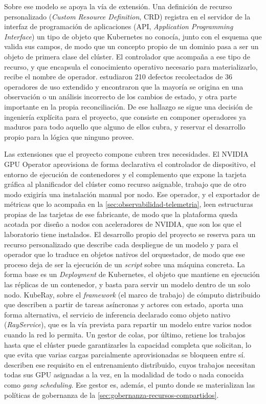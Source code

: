 Sobre ese modelo se apoya la vía de extensión. Una definición de recurso personalizado (\emph{Custom Resource Definition}, CRD) registra en el servidor de la interfaz de programación de aplicaciones (API, \emph{Application Programming Interface}) un tipo de objeto que Kubernetes no conocía, junto con el esquema que valida sus campos, de modo que un concepto propio de un dominio pasa a ser un objeto de primera clase del clúster. El controlador que acompaña a ese tipo de recurso, y que encapsula el conocimiento operativo necesario para materializarlo, recibe el nombre de operador. \citet{xu-k8soperatorbugs-2024} estudiaron 210 defectos recolectados de 36 operadores de uso extendido y encontraron que la mayoría se origina en una observación o un análisis incorrecto de los cambios de estado, y otra parte importante en la propia reconciliación. De ese hallazgo se sigue una decisión de ingeniería explícita para el proyecto, que consiste en componer operadores ya maduros para todo aquello que alguno de ellos cubra, y reservar el desarrollo propio para la lógica que ninguno provee.

Las extensiones que el proyecto compone cubren tres necesidades. El NVIDIA GPU Operator aprovisiona de forma declarativa el controlador de dispositivo, el entorno de ejecución de contenedores y el complemento que expone la tarjeta gráfica al planificador del clúster como recurso asignable, trabajo que de otro modo exigiría una instalación manual por nodo. Ese operador, y el exportador de métricas que lo acompaña en la \cref{sec:observabilidad-telemetria}, leen estructuras propias de las tarjetas de ese fabricante, de modo que la plataforma queda acotada por diseño a nodos con aceleradores de NVIDIA, que son los que el laboratorio tiene instalados. El desarrollo propio del proyecto se reserva para un recurso personalizado que describe cada despliegue de un modelo y para el operador que lo traduce en objetos nativos del orquestador, de modo que ese proceso deja de ser la ejecución de un \emph{script} sobre una máquina concreta. La forma base es un \emph{Deployment} de Kubernetes, el objeto que mantiene en ejecución las réplicas de un contenedor, y basta para servir un modelo dentro de un solo nodo. KubeRay, sobre el \emph{framework} (el marco de trabajo) de cómputo distribuido que \citet{moritz-ray-2018} describen a partir de tareas asíncronas y actores con estado, aporta una forma alternativa, el servicio de inferencia declarado como objeto nativo (\emph{RayService}), que es la vía prevista para repartir un modelo entre varios nodos cuando la red lo permita. Un gestor de colas, por último, retiene los trabajos hasta que el clúster puede garantizarles la capacidad completa que solicitan, lo que evita que varias cargas parcialmente aprovisionadas se bloqueen entre sí. \citet{ye-dlschedulingsurvey-2024} describen ese requisito en el entrenamiento distribuido, cuyos trabajos necesitan todas sus GPU asignadas a la vez, en la modalidad de todo o nada conocida como \emph{gang scheduling}. Ese gestor es, además, el punto donde se materializan las políticas de gobernanza de la \cref{sec:gobernanza-recursos-compartidos}.

